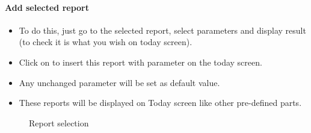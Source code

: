\documentclass[letterpaper,10pt,english]{sphinxmanual}
\begin{document}
\paragraph{Add selected report}
\begin{itemize}
\item {} 
To do this, just go to the selected report, select parameters and display result (to check it is what you wish on today screen).

\item {} 
Click on  to insert this report with parameter on the today screen.

\item {} 
Any unchanged parameter will be set as default value.

\item {} 
These reports will be displayed on Today screen like other pre-defined parts.

\end{itemize}
\begin{figure}[htbp]
\centering
\capstart

\caption{Report selection}\end{figure}
\end{document}
